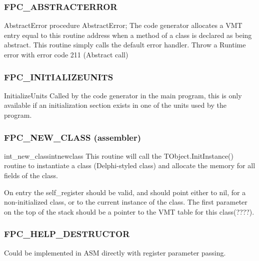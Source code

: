 \documentclass [12pt]{article}
\begin{document}
\subsubsection{FPC{\_}ABSTRACTERROR}
\label{subsubsec:mylabel79}

\begin{function}{AbstractError}
\Declaration
procedure AbstractError;
\Description 
The code generator allocates a VMT entry equal to this routine address when
a method of a class is declared as being abstract. This routine simply calls
the default error handler.
\Algorithm 
Throw a Runtime error with error code 211 (Abstract call)
\end{function}

\subsubsection{FPC{\_}INITIALIZEUNITS}
\label{subsubsec:mylabel80}

\begin{function}{InitializeUnits}
\Declaration
\Description 
Called by the code generator in the main program, this is only available if
an \textsf{initialization} section exists in one of the units used by the
program.
\end{function}

\subsubsection{FPC{\_}NEW{\_}CLASS (assembler)}
\label{subsubsec:mylabel81}

\begin{procedurel}{int{\_}new{\_}class}{intnewclass}
\Description 
This routine will call the TObject.InitInstance() routine to 
instantiate a class (Delphi-styled class) and allocate the memory for all 
fields of the class. 

On entry the self{\_}register should be valid, and should point either to 
nil, for a non-initialized class, or to the current instance of the class. 
The first parameter on the top of the stack should be a pointer to the VMT 
table for this class(????).
\end{procedurel}

\subsubsection{FPC{\_}HELP{\_}DESTRUCTOR}
\label{subsubsec:mylabel82}

Could be implemented in ASM directly with register parameter passing.
\end{document}
